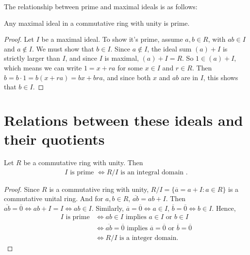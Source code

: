 The relationship between prime and maximal ideals is as follows:

\begin{proposition}{}{}
    Any maximal ideal in a commutative ring with unity is prime.    
\end{proposition}

\begin{proof}
    Let $I$ be a maximal ideal. To show it's prime, assume $a,b\in R$, with $ab\in I$ and $a\notin I$. 
    We must show that $b\in I$. Since $a\notin I$, the ideal sum $(a)+I$ is strictly larger than $I$, and
    since $I$ is maximal, $(a)+I=R$. So $1\in (a)+I$, which means we can write $1=x+ra$ for some $x\in I$ and $r\in R$.
    Then $b=b\cdot 1= b(x+ra)=bx+bra$, and since both $x$ and $ab$ are in $I$, this shows that $b\in I$.
\end{proof}


\section{Relations between these ideals and their quotients}
\begin{proposition}{}{}
    Let $R$ be a commutative ring with unity. Then
    \begin{align*}
        I \text{ is prime } \Leftrightarrow R/I \text{ is an integral domain }.
    \end{align*} 
\end{proposition}

\begin{proof}
    Since $R$ is a commutative ring with unity, $R/I=\{\overline{a}=a+I:a\in R\}$ is a commutative unital ring.
    And for $a,b\in R$, $\overline{ab}=ab+ I$. Then $\overline{ab}=\overline{0}\Leftrightarrow ab+I = I\Leftrightarrow ab\in I$.
    Similarly, $\overline{a}=\overline{0}\Leftrightarrow a\in I$, $\overline{b}=\overline{0}\Leftrightarrow b\in I$.
    Hence,
    \begin{align*}
        I \text{ is prime} &\Leftrightarrow ab\in I \text{ implies } a\in I \text{ or } b\in I \\
        &\Leftrightarrow \overline{ab}=\overline{0} \text{ implies } \overline{a}=\overline{0} \text{ or }\overline{b}=\overline{0} \\
        &\Leftrightarrow R/I \text{ is a integer domain}.
    \end{align*}
\end{proof}

